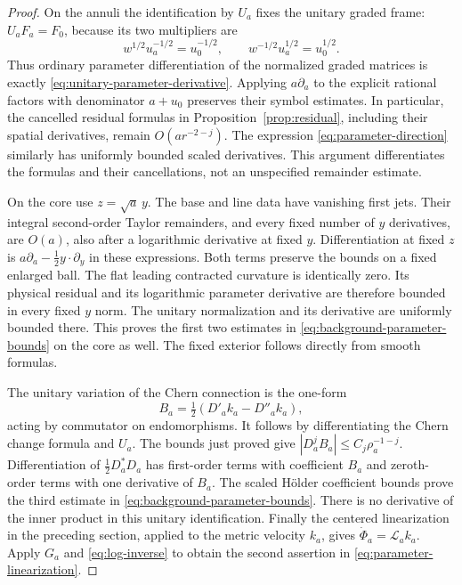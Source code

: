 \begin{proof}
On the annuli the identification by \(U_a\) fixes the unitary
graded frame: \(U_aF_a=F_0\), because its two multipliers are
\[
 w^{1/2}u_a^{-1/2}=u_0^{-1/2},\qquad
 w^{-1/2}u_a^{1/2}=u_0^{1/2}.
\]
Thus ordinary parameter differentiation of the normalized
graded matrices is exactly \eqref{eq:unitary-parameter-derivative}.
Applying \(a\partial_a\) to the explicit rational factors
with denominator \(a+u_0\) preserves their symbol estimates.
In particular, the cancelled residual formulas in
Proposition~\ref{prop:residual}, including their spatial
derivatives, remain \(O(a r^{-2-j})\).
The expression \eqref{eq:parameter-direction} similarly
has uniformly bounded scaled derivatives. This argument
differentiates the formulas and their cancellations, not
an unspecified remainder estimate.

On the core use \(z=\sqrt a\,y\). The base and line data
have vanishing first jets. Their integral second-order
Taylor remainders, and every fixed number of \(y\) derivatives,
are \(O(a)\), also after a logarithmic derivative at fixed
\(y\). Differentiation at fixed \(z\) is
\(a\partial_a-\frac12y\cdot\partial_y\) in these expressions.
Both terms preserve the bounds on a fixed enlarged ball.
The flat leading contracted curvature is identically zero.
Its physical residual and its logarithmic parameter derivative
are therefore bounded in every fixed \(y\) norm. The unitary
normalization and its derivative are uniformly bounded there.
This proves the first two estimates in
\eqref{eq:background-parameter-bounds} on the core as well.
The fixed exterior follows directly from smooth formulas.

The unitary variation of the Chern connection is the one-form
\[
 B_a=\tfrac12(D'_ak_a-D''_ak_a),
\]
acting by commutator on endomorphisms. It follows by
differentiating the Chern change formula and \(U_a\).
The bounds just proved give
\(|D_a^jB_a|\le C_j\rho_a^{-1-j}\).
Differentiation of \(\frac12D_a^*D_a\) has first-order
terms with coefficient \(B_a\) and zeroth-order terms
with one derivative of \(B_a\). The scaled Hölder
coefficient bounds prove the third estimate in
\eqref{eq:background-parameter-bounds}.
There is no derivative of the inner product in this
unitary identification. Finally the centered linearization
in the preceding section, applied to the metric velocity
\(k_a\), gives \(\dot\Phi_a=\mathcal L_ak_a\).
Apply \(G_a\) and \eqref{eq:log-inverse} to obtain
the second assertion in \eqref{eq:parameter-linearization}.
\end{proof}

